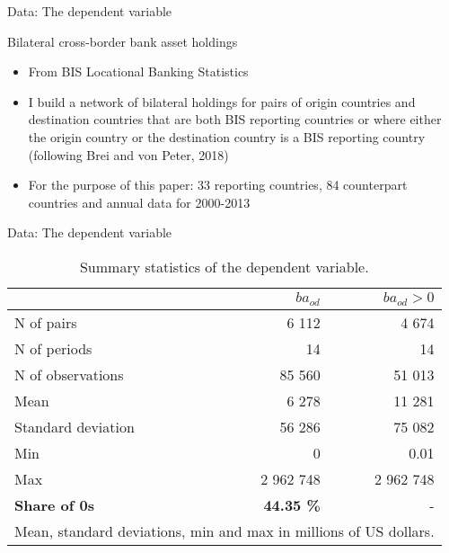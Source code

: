 \documentclass{beamer}
\begin{document}
\begin{frame}{Data: The dependent variable}
\begin{block}{Bilateral cross-border bank asset holdings}
\begin{itemize}
\item From BIS Locational Banking Statistics
\item I build a network of bilateral holdings for pairs of origin countries and destination countries that are both BIS reporting countries or where either the origin country or the destination country is a BIS reporting country (following Brei and von Peter, 2018)
\item For the purpose of this paper: 33 reporting countries, 84 counterpart countries and annual data for 2000-2013
\end{itemize}
\end{block}
\end{frame}


\begin{frame}{Data: The dependent variable}
\begin{table}
\centering
\begin{tabular}{l|r r }
\hline
 & $ba_{od}$ & $ba_{od} > 0$  \\ 
\hline
N of pairs & 6 112 & 4 674  \\
N of periods & 14 & 14  \\
N of observations & 85 560 & 51 013 \\
\hline
Mean & 6 278 & 11 281  \\
Standard deviation & 56 286 & 75 082 \\
Min & 0 & 0.01 \\
Max & 2 962 748 & 2 962 748 \\
\hline
\textbf{Share of 0s} &\textbf{ 44.35 \%} & - \\
\hline 
\multicolumn{3}{l}{\footnotesize Mean, standard deviations, min and max in millions of US dollars.}
\end{tabular}
\caption{Summary statistics of the dependent variable.}
\label{tab:ba_od}
\end{table}
\end{frame}
\end{document}
